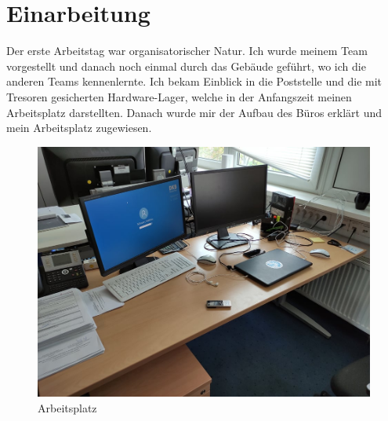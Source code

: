 \section{Einarbeitung}
\label{sec:Einarbeitung}

Der erste Arbeitstag war organisatorischer Natur. Ich wurde meinem Team vorgestellt und danach noch einmal durch das Gebäude geführt, wo ich die anderen Teams kennenlernte. Ich bekam Einblick in die Poststelle und die mit Tresoren gesicherten Hardware-Lager, welche in der Anfangszeit meinen Arbeitsplatz darstellten. Danach wurde mir der Aufbau des Büros erklärt und mein Arbeitsplatz zugewiesen.
\begin{figure}[H] 
  \centering
     \includegraphics[width=1\textwidth]{arbeitsplatz.jpg}
  \caption{Arbeitsplatz}
  \label{fig:Bild1}
\end{figure}
\noindent
